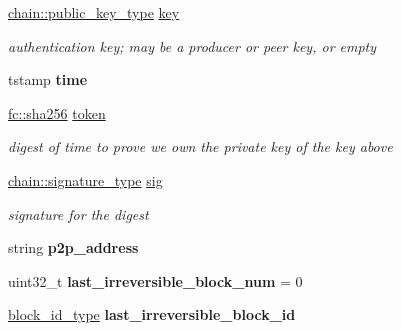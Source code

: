 \begin{DoxyCompactItemize}
\mbox{\hyperlink{classfc_1_1crypto_1_1public__key}{chain\+::public\+\_\+key\+\_\+type}} \mbox{\hyperlink{structaacio_1_1handshake__message_afdf5639e2ce584e8e701cb1c18f0d051}{key}}
\begin{DoxyCompactList}\small\item\em authentication key; may be a producer or peer key, or empty \end{DoxyCompactList}\item 
\mbox{\label{structaacio_1_1handshake__message_a0e2dfb66fd9cb50cafa3f2bd8fa820c7}} 
tstamp {\bfseries time}
\item 
\mbox{\label{structaacio_1_1handshake__message_a7643f7c254b591d4fefa88efff7d57b2}} 
\mbox{\hyperlink{classfc_1_1sha256}{fc\+::sha256}} \mbox{\hyperlink{structaacio_1_1handshake__message_a7643f7c254b591d4fefa88efff7d57b2}{token}}
\begin{DoxyCompactList}\small\item\em digest of time to prove we own the private key of the key above \end{DoxyCompactList}\item 
\mbox{\label{structaacio_1_1handshake__message_a45417785872ee23d0ccf90438971d73f}} 
\mbox{\hyperlink{classfc_1_1crypto_1_1signature}{chain\+::signature\+\_\+type}} \mbox{\hyperlink{structaacio_1_1handshake__message_a45417785872ee23d0ccf90438971d73f}{sig}}
\begin{DoxyCompactList}\small\item\em signature for the digest \end{DoxyCompactList}\item 
\mbox{\label{structaacio_1_1handshake__message_ac9deb04dbdaa629e0b564230a87082e5}} 
string {\bfseries p2p\+\_\+address}
\item 
\mbox{\label{structaacio_1_1handshake__message_aab63678a90855f24c18275c97ed9c407}} 
uint32\+\_\+t {\bfseries last\+\_\+irreversible\+\_\+block\+\_\+num} = 0
\item 
\mbox{\label{structaacio_1_1handshake__message_a4aa9789464b54013d1ead4b7a453773c}} 
\mbox{\hyperlink{classfc_1_1sha256}{block\+\_\+id\+\_\+type}} {\bfseries last\+\_\+irreversible\+\_\+block\+\_\+id}

\end{DoxyCompactItemize}
